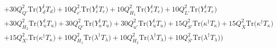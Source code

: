 {\begin{align}
 &+30 Q_{Q'}^{2} \mbox{Tr}\Big({Y_{d}^{\dagger}  T_d}\Big) +10 Q_{e'}^{2} \mbox{Tr}\Big({Y_{e}^{\dagger}  T_e}\Big) +10 Q_{H_1}^{2} \mbox{Tr}\Big({Y_{e}^{\dagger}  T_e}\Big) +10 Q_{L'}^{2} \mbox{Tr}\Big({Y_{e}^{\dagger}  T_e}\Big) \nonumber \\ 
 &+30 Q_{H_2}^{2} \mbox{Tr}\Big({Y_{u}^{\dagger}  T_u}\Big) +30 Q_{Q'}^{2} \mbox{Tr}\Big({Y_{u}^{\dagger}  T_u}\Big) +30 Q_{u'}^{2} \mbox{Tr}\Big({Y_{u}^{\dagger}  T_u}\Big) +15 Q_{S'}^{2} \mbox{Tr}\Big({\kappa^{\dagger}  T_{\kappa}}\Big) +15 Q_{\bar{X}}^{2} \mbox{Tr}\Big({\kappa^{\dagger}  T_{\kappa}}\Big) \nonumber \\ 
 &+15 Q_{X'}^{2} \mbox{Tr}\Big({\kappa^{\dagger}  T_{\kappa}}\Big) +10 Q_{H_1}^{2} \mbox{Tr}\Big({\lambda^{\dagger}  T_{\lambda}}\Big) +10 Q_{H_2}^{2} \mbox{Tr}\Big({\lambda^{\dagger}  T_{\lambda}}\Big) +10 Q_{S'}^{2} \mbox{Tr}\Big({\lambda^{\dagger}  T_{\lambda}}\Big) \Big)
\end{align}} 
